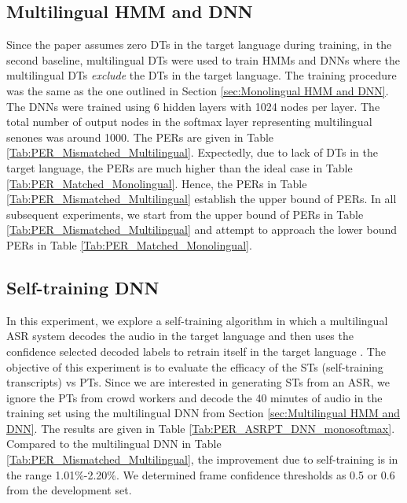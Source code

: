 \documentclass[a4paper]{article}
\begin{document}
\subsection{Multilingual HMM and DNN} \vspace{-2mm}
\label{sec:Multilingual HMM and DNN}
Since the paper assumes zero DTs in the target language during training, in the second baseline, multilingual DTs were used to train HMMs and DNNs where the multilingual DTs \emph{exclude} the DTs in the target language.  The training procedure was the same as the one outlined in Section \ref{sec:Monolingual HMM and DNN}. The DNNs were trained using 6 hidden layers with 1024 nodes per layer. The total number of output nodes in the softmax layer representing multilingual senones was around 1000.  The PERs are given in Table \ref{Tab:PER_Mismatched_Multilingual}. Expectedly, due to lack of DTs in the target language, the PERs are much higher than the ideal case in Table \ref{Tab:PER_Matched_Monolingual}. Hence, the PERs in Table \ref{Tab:PER_Mismatched_Multilingual} establish the upper bound of PERs. In all subsequent experiments, we start from the upper bound of PERs in Table \ref{Tab:PER_Mismatched_Multilingual} and attempt to approach the lower bound PERs in Table \ref{Tab:PER_Matched_Monolingual}. 
\vspace{-3mm}


\subsection{Self-training DNN} \vspace{-2mm}
\label{sec:Self-training}
In this experiment, we explore a self-training algorithm \cite{Vesely-SemisupTrainingDNN} in which a multilingual ASR system decodes the audio in the target language and then uses the confidence selected decoded labels to retrain itself in the target language \cite{Knill-SelfTrainingAndUnsupAdapt}. The objective of this experiment is to evaluate the efficacy of the STs (self-training transcripts) vs PTs. Since we are interested in generating STs from an ASR, we ignore the PTs from crowd workers and decode the 40 minutes of audio in the training set using the multilingual DNN from Section \ref{sec:Multilingual HMM and DNN}. %
The results are given in Table \ref{Tab:PER_ASRPT_DNN_monosoftmax}. Compared to the multilingual DNN in Table \ref{Tab:PER_Mismatched_Multilingual}, the improvement due to self-training is in the range 1.01\%-2.20\%. We determined frame confidence thresholds as 0.5 or 0.6 from the development set. 
\vspace{-3mm}
\end{document}
